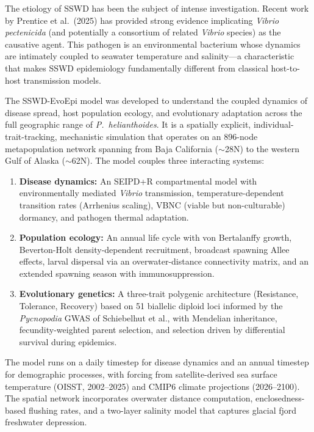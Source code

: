 \documentclass[11pt,letterpaper]{article}
\begin{document}
The etiology of SSWD has been the subject of intense investigation. Recent work by Prentice et al.\ (2025) has provided strong evidence implicating \textit{Vibrio pectenicida} (and potentially a consortium of related \textit{Vibrio} species) as the causative agent. This pathogen is an environmental bacterium whose dynamics are intimately coupled to seawater temperature and salinity---a characteristic that makes SSWD epidemiology fundamentally different from classical host-to-host transmission models.

The SSWD-EvoEpi model was developed to understand the coupled dynamics of disease spread, host population ecology, and evolutionary adaptation across the full geographic range of \textit{P.\ helianthoides}. It is a spatially explicit, individual-trait-tracking, mechanistic simulation that operates on an 896-node metapopulation network spanning from Baja California ($\sim$28\textdegree N) to the western Gulf of Alaska ($\sim$62\textdegree N). The model couples three interacting systems:

\begin{enumerate}[leftmargin=2cm]
  \item \textbf{Disease dynamics:} An SEIPD+R compartmental model with environmentally mediated \textit{Vibrio} transmission, temperature-dependent transition rates (Arrhenius scaling), VBNC (viable but non-culturable) dormancy, and pathogen thermal adaptation.
  \item \textbf{Population ecology:} An annual life cycle with von Bertalanffy growth, Beverton-Holt density-dependent recruitment, broadcast spawning Allee effects, larval dispersal via an overwater-distance connectivity matrix, and an extended spawning season with immunosuppression.
  \item \textbf{Evolutionary genetics:} A three-trait polygenic architecture (Resistance, Tolerance, Recovery) based on 51 biallelic diploid loci informed by the \textit{Pycnopodia} GWAS of Schiebelhut et al., with Mendelian inheritance, fecundity-weighted parent selection, and selection driven by differential survival during epidemics.
\end{enumerate}

The model runs on a daily timestep for disease dynamics and an annual timestep for demographic processes, with forcing from satellite-derived sea surface temperature (OISST, 2002--2025) and CMIP6 climate projections (2026--2100). The spatial network incorporates overwater distance computation, enclosedness-based flushing rates, and a two-layer salinity model that captures glacial fjord freshwater depression.
\end{document}
